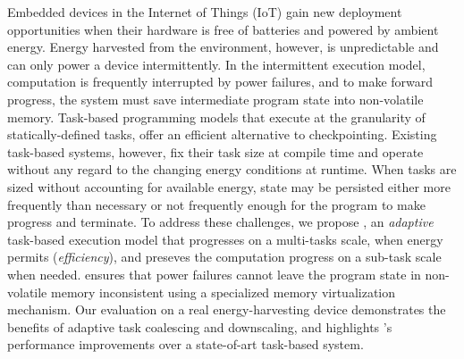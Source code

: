 Embedded devices in the Internet of Things (IoT) gain new deployment opportunities when their hardware is free of batteries and powered by ambient energy. Energy harvested from the environment, however, is unpredictable and can only power a device intermittently. In the intermittent execution model, computation is frequently interrupted by power failures, and to make forward progress, the system must save intermediate program state into non-volatile memory. Task-based programming models that execute at the granularity of statically-defined tasks, offer an efficient alternative to checkpointing. Existing task-based systems, however, fix their task size at compile time and operate without any regard to the changing energy conditions at runtime. When tasks are sized without accounting for available energy, state may be persisted either more frequently than necessary or not frequently enough for the program to make progress and terminate. To address these challenges, we propose \sys, an \emph{adaptive} task-based execution model that  progresses on a multi-tasks scale, when energy permits (\emph{efficiency}), and preseves the computation progress on a sub-task scale when needed. \sys ensures that power failures cannot leave the program state in non-volatile memory inconsistent using a specialized memory virtualization mechanism. Our evaluation on a real energy-harvesting device demonstrates the benefits of adaptive task coalescing and downscaling, and highlights \sys's performance improvements over a state-of-art task-based system.